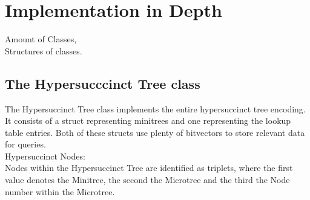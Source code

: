 \documentclass{article}
\begin{document}
\section{Implementation in Depth}
Amount of Classes,\\
Structures of classes.
\subsection{The Hypersucccinct Tree class}
The Hypersuccinct Tree class implements the entire hypersuccinct tree encoding. It consists of a struct representing minitrees and one representing the lookup table entries.
Both of these structs use plenty of bitvectors to store relevant data for queries.\\

Hypersuccinct Nodes:\\
Nodes within the Hypersuccinct Tree are identified as triplets, where the first value denotes the Minitree, the second the Microtree and the third the Node number within the Microtree.\\
\end{document}
